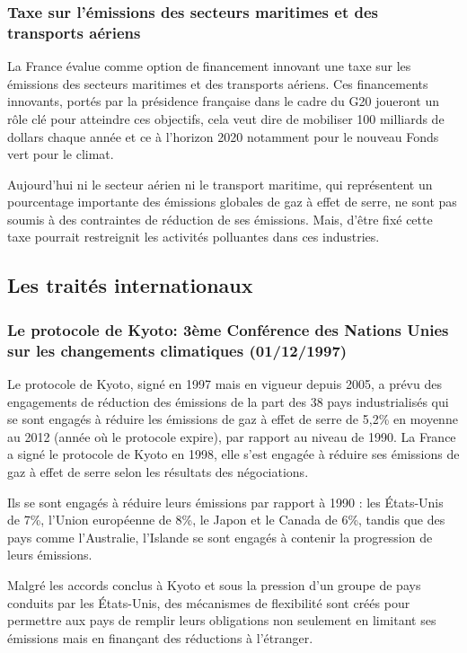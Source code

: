 \documentclass[a4paper,10pt]{article}
\begin{document}
\subsubsection{Taxe sur {\color{red}l}'émissions des secteurs maritimes et des transports aériens}

La France évalue comme option de financement innovant une taxe sur les émissions
des secteurs  maritimes et des  transports aériens. Ces  financements innovants,
portés par  la présidence française  dans le cadre  du G20 joueront un  rôle clé
pour  atteindre ces  objectifs, cela  veut dire  de mobiliser  100  milliards de
dollars chaque année et ce à l’horizon 2020 notamment pour le nouveau Fonds vert
pour le climat.


Aujourd'hui ni le  secteur aérien ni le transport  maritime, qui représentent un
pourcentage importante des  émissions globales de gaz à effet  de serre, ne sont
pas soumis  à des contraintes de  réduction de ses émissions.  Mais, d’être fixé
cette taxe pourrait restreignit les activités polluantes dans ces industries.


\subsection{Les traités internationaux}

\subsubsection[Le protocole de Kyoto]{Le protocole de Kyoto: 3ème Conférence des Nations Unies sur les changements climatiques  (01/12/1997)}

Le protocole de  Kyoto, signé en 1997  mais en vigueur depuis 2005,  a prévu des
engagements de réduction des émissions de la part des 38 pays industrialisés qui
se sont  engagés à réduire  les émissions de  gaz à effet  de serre de  5,2\% en
moyenne  au 2012  (année  où le  protocole  expire), par  rapport  au niveau  de
1990. La  France a signé  le protocole  de Kyoto en  1998, elle s’est  engagée à
réduire  ses  émissions  de  gaz  à  effet de  serre  selon  les  résultats  des
négociations.


Ils  se  sont engagés  à  réduire  leurs émissions  par  rapport  à  1990 :  les
États-Unis de  7\%, l’Union  européenne de 8\%,  le Japon  et le Canada  de 6\%,
tandis que des  pays comme l’Australie, l’Islande se sont  engagés à contenir la
progression de leurs émissions.


Malgré  les accords conclus  à Kyoto  et sous  la pression  d'un groupe  de pays
conduits  par les  États-Unis, des  mécanismes  de flexibilité  sont créés  pour
permettre aux pays de remplir leurs obligations non seulement en limitant ses émissions
mais en finançant des réductions à l'étranger. 
\end{document}

